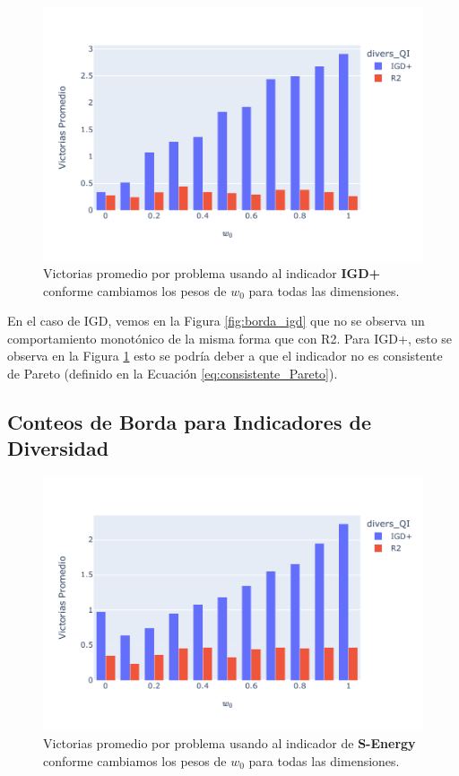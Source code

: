 \begin{figure} [H]
    \centering
\includegraphics[width=\textwidth]{Figuras/borda_obj_ind_igd+.pdf}
\caption[Conteo de borda IGD+]{Victorias promedio por problema usando al indicador \textbf{IGD+} conforme cambiamos los pesos de $w_0$ para todas las dimensiones.}
\label{fig:borda_igdp}
\end{figure}

En el caso de IGD, vemos en la Figura \ref{fig:borda_igd} que no se observa un comportamiento monotónico de la misma forma que con R2. Para IGD+, esto se observa en la Figura \ref{fig:borda_igdp} esto se podría deber a que el indicador no es consistente de Pareto (definido en la Ecuación \ref{eq:consistente_Pareto}).


\subsection*{Conteos de Borda para Indicadores de Diversidad}

\begin{figure} [H]
    \centering
    \includegraphics[width=\textwidth]{Figuras/borda_obj_ind_s-energy.pdf}
    \caption[Conteo de borda IGD+]{Victorias promedio por problema usando al indicador de \textbf{S-Energy} conforme cambiamos los pesos de $w_0$ para todas las dimensiones.}
    \label{fig:borda_senergy}
\end{figure}

